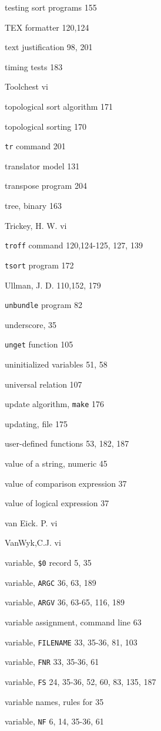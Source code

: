 \begin{multicols}{3}
testing sort programs 155

TEX formatter 120,124

text justification 98, 201

timing tests 183

Toolchest vi

topological sort algorithm 171

topological sorting 170

\verb'tr' command 201

translator model 131

transpose program 204

tree, binary 163

Trickey, H. W. vi

\verb'troff' command 120,124-125, 127, 139

\verb'tsort' program 172





Ullman, J. D. 110,152, 179

\verb'unbundle' program 82

underscore, 35

\verb'unget' function 105

uninitialized variables 51, 58

universal relation 107

update algorithm, \verb'make' 176

updating, file 175

user-defined functions 53, 182,  187

value of a string, numeric 45

value of comparison expression 37

value of logical expression 37

van Eick. P. vi

VanWyk,C.J. vi

variable, \verb'$0' record 5, 35

variable, \verb'ARGC' 36, 63, 189

variable, \verb'ARGV' 36, 63-65, 116, 189

variable assignment, command line 63

variable, \verb'FILENAME' 33, 35-36, 81, 103

variable, \verb'FNR' 33, 35-36, 61

variable, \verb'FS' 24, 35-36, 52, 60, 83, 135, 187

variable names, rules for 35

variable, \verb'NF' 6, 14, 35-36, 61


\end{multicols}
